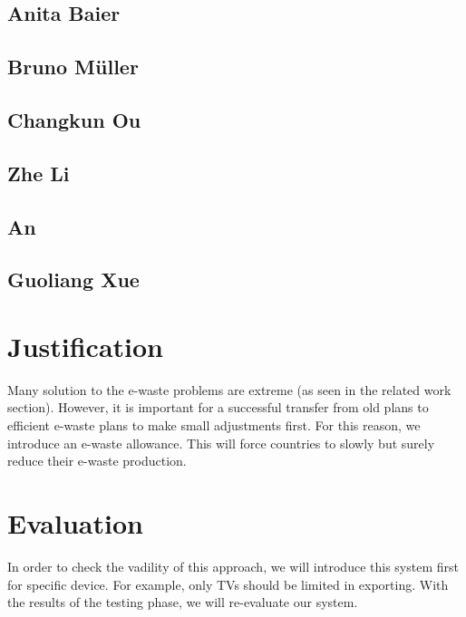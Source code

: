 \documentclass[sigchi-a, authorversion]{acmart}
\begin{document}
\subsection{Anita Baier}
 

\subsection{Bruno M\"uller}


\subsection{Changkun Ou}


\subsection{Zhe Li}


\subsection{An}


\subsection{Guoliang Xue}


\section{Justification}

Many solution to the e-waste problems are extreme (as seen in the related work section). However, it is important
for a successful transfer from old plans to efficient e-waste plans to make small adjustments first. 
For this reason, we introduce an e-waste allowance. This will force countries to slowly but surely reduce their e-waste production.

\section{Evaluation}

In order to check the vadility of this approach, we will introduce this system first for specific device. 
For example, only TVs should be limited in exporting. With the results of the testing phase, we will 
re-evaluate our system.
\end{document}
